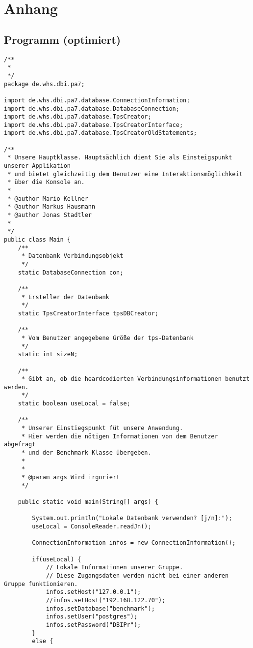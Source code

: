 \section{Anhang}
\subsection{Programm (optimiert)}
\label{app:programmv2}

\begin{lstlisting}[caption={Main (optimiert)}, label={lst:mainv2}]
/**
 * 
 */
package de.whs.dbi.pa7;

import de.whs.dbi.pa7.database.ConnectionInformation;
import de.whs.dbi.pa7.database.DatabaseConnection;
import de.whs.dbi.pa7.database.TpsCreator;
import de.whs.dbi.pa7.database.TpsCreatorInterface;
import de.whs.dbi.pa7.database.TpsCreatorOldStatements;

/**
 * Unsere Hauptklasse. Hauptsächlich dient Sie als Einsteigspunkt unserer Applikation
 * und bietet gleichzeitig dem Benutzer eine Interaktionsmöglichkeit
 * über die Konsole an.
 * 
 * @author Mario Kellner
 * @author Markus Hausmann
 * @author Jonas Stadtler
 *
 */
public class Main {
	/**
	 * Datenbank Verbindungsobjekt
	 */
	static DatabaseConnection con;
	
	/**
	 * Ersteller der Datenbank
	 */
	static TpsCreatorInterface tpsDBCreator;
	
	/**
	 * Vom Benutzer angegebene Größe der tps-Datenbank
	 */
	static int sizeN;
	
	/**
	 * Gibt an, ob die heardcodierten Verbindungsinformationen benutzt werden.
	 */
	static boolean useLocal = false;
	
	/**
	 * Unserer Einstiegspunkt füt unsere Anwendung.
	 * Hier werden die nötigen Informationen von dem Benutzer abgefragt
	 * und der Benchmark Klasse übergeben.
	 * 
	 * 
	 * @param args Wird irgoriert
	 */
	
	public static void main(String[] args) {
		
		System.out.println("Lokale Datenbank verwenden? [j/n]:");
		useLocal = ConsoleReader.readJn();
		
		ConnectionInformation infos = new ConnectionInformation();
		
		if(useLocal) {
			// Lokale Informationen unserer Gruppe.
			// Diese Zugangsdaten werden nicht bei einer anderen Gruppe funktionieren.
			infos.setHost("127.0.0.1");
			//infos.setHost("192.168.122.70");
			infos.setDatabase("benchmark");
			infos.setUser("postgres");
			infos.setPassword("DBIPr");
		}
		else {
			

\end{lstlisting}
